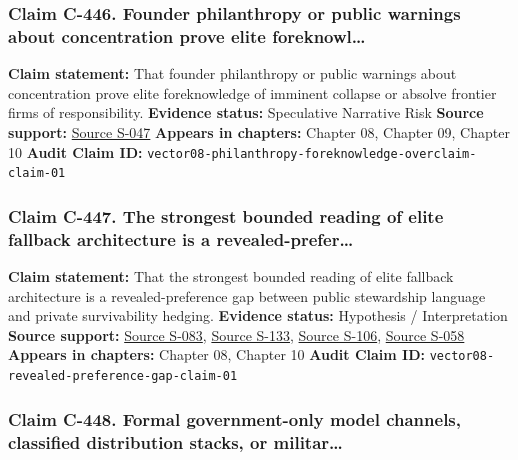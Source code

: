 \documentclass[
  american,
  11pt,
  letterpaper,
]{article}
\begin{document}
\subsubsection{Claim C-446. Founder philanthropy or public warnings
about concentration prove elite
foreknowl\ldots{}}\label{claim-c-446-founder-philanthropy-or-public-warnings-about-concentration-prove-elite-foreknowl}

\textbf{Claim statement:} That founder philanthropy or public warnings
about concentration prove elite foreknowledge of imminent collapse or
absolve frontier firms of responsibility. \textbf{Evidence status:}
Speculative Narrative Risk \textbf{Source support:}
\hyperref[source-s-047-the-adolescence-of-technology]{Source S-047}
\textbf{Appears in chapters:} Chapter 08, Chapter 09, Chapter 10
\textbf{Audit Claim ID:}
\texttt{vector08-philanthropy-foreknowledge-overclaim-claim-01}

\subsubsection{Claim C-447. The strongest bounded reading of elite
fallback architecture is a
revealed-prefer\ldots{}}\label{claim-c-447-the-strongest-bounded-reading-of-elite-fallback-architecture-is-a-revealed-prefer}

\textbf{Claim statement:} That the strongest bounded reading of elite
fallback architecture is a revealed-preference gap between public
stewardship language and private survivability hedging. \textbf{Evidence
status:} Hypothesis / Interpretation \textbf{Source support:}
\hyperref[source-s-083-sam-altman-s-manifest-destiny]{Source S-083},
\hyperref[source-s-133-inside-mark-zuckerbergs-top-secret-hawaii-compound]{Source
S-133},
\hyperref[source-s-106-mark-zuckerberg-downplays-his-5-000-square-foot-underground-bunker-in-hawaii-just-a-little-shelter]{Source
S-106},
\hyperref[source-s-058-new-zealand-woos-the-wealthy-with-golden-visa-changes]{Source
S-058} \textbf{Appears in chapters:} Chapter 08, Chapter 10
\textbf{Audit Claim ID:}
\texttt{vector08-revealed-preference-gap-claim-01}

\subsubsection{Claim C-448. Formal government-only model channels,
classified distribution stacks, or
militar\ldots{}}\label{claim-c-448-formal-government-only-model-channels-classified-distribution-stacks-or-militar}
\end{document}
